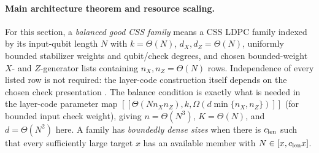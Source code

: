 \documentclass[aps,prx,reprint,superscriptaddress,nofootinbib,floatfix,longbibliography]{revtex4-2}
\theoremstyle{definition}
\begin{document}
\paragraph{Main architecture theorem and resource scaling.}
For this section, a \emph{balanced good CSS family} means a CSS LDPC family
indexed by its input-qubit length $N$ with $k=\Theta(N)$,
$d_X,d_Z=\Theta(N)$, uniformly bounded stabilizer weights and qubit/check
degrees, and chosen bounded-weight $X$- and $Z$-generator lists containing
$n_X,n_Z=\Theta(N)$ rows.  Independence of every listed row is not required:
the layer-code construction itself depends on the chosen check presentation
\cite{WilliamsonBaspinLayerCodes}.  The balance condition is exactly what is
needed in the layer-code parameter map
$[[\Theta(Nn_Xn_Z),k,\Omega(d\min\{n_X,n_Z\})]]$ (for bounded input check
weight), giving $n=\Theta(N^3)$, $K=\Theta(N)$, and $d=\Theta(N^2)$ here.
A family has \emph{boundedly dense sizes} when there is $c_{\rm len}$ such
that every sufficiently large target $x$ has an available member with
$N\in[x,c_{\rm len}x]$.
\end{document}
